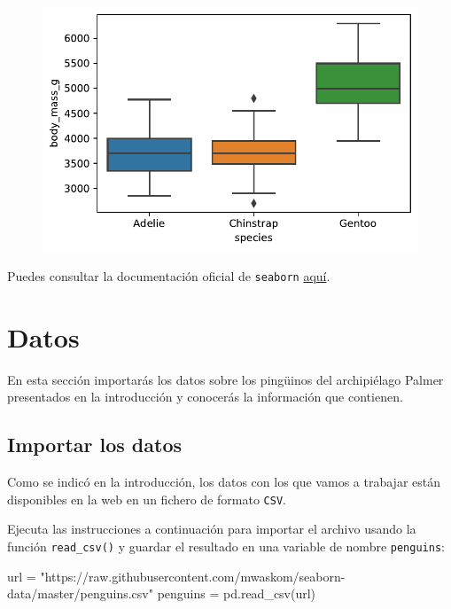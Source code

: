\documentclass[
  a4paper,
  noprof,
  12pt,
  notoc,
  nosols,
  nobib]{mnye}
\newenvironment{Shaded}{\begin{snugshade}}{\end{snugshade}}
\newcommand{\NormalTok}[1]{\textcolor[rgb]{0.00,0.23,0.31}{#1}}
\newcommand{\OperatorTok}[1]{\textcolor[rgb]{0.37,0.37,0.37}{#1}}
\newcommand{\StringTok}[1]{\textcolor[rgb]{0.13,0.47,0.30}{#1}}
\theoremstyle{definition}
\theoremstyle{remark}
\begin{document}
\begin{figure}[tbph]

{\centering \includegraphics{chapters/libraries_files/figure-pdf/cell-5-output-1.pdf}

}

\end{figure}

Puedes consultar la documentación oficial de \texttt{seaborn}
\href{https://seaborn.pydata.org/index.html}{aquí}.


\hypertarget{datos}{%
\section{Datos}\label{datos}}

En esta sección importarás los datos sobre los pingüinos del
archipiélago Palmer presentados en la introducción y conocerás la
información que contienen.

\hypertarget{importar-los-datos}{%
\subsection{Importar los datos}\label{importar-los-datos}}

Como se indicó en la introducción, los datos con los que vamos a
trabajar están disponibles en la web en un fichero de formato
\texttt{CSV}.

Ejecuta las instrucciones a continuación para importar el archivo usando
la función \texttt{read\_csv()} y guardar el resultado en una variable
de nombre \texttt{penguins}:

\begin{Shaded}
\begin{Highlighting}[]
\NormalTok{url }\OperatorTok{=} \StringTok{"https://raw.githubusercontent.com/mwaskom/seaborn{-}data/master/penguins.csv"}
\NormalTok{penguins }\OperatorTok{=}\NormalTok{ pd.read\_csv(url)}
\end{Highlighting}
\end{Shaded}
\end{document}
